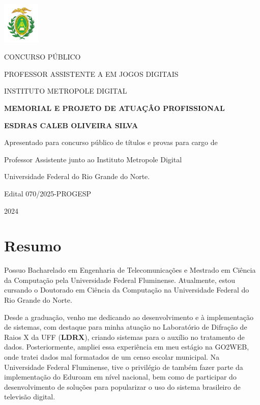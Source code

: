 \documentclass[10pt,a4paper,oneside]{book}
\newcommand{\Year}{2024}
\newcommand{\Author}{Esdras Caleb Oliveira Silva}
\newcommand{\UFF}{Universidade Federal Fluminense}
\newcommand{\UFRN}{Universidade Federal do Rio Grande do Norte}
\begin{document}
\pagestyle{plain}
\frontmatter

\begin{titlepage}
  \begin{center}
    \includegraphics[height=2cm]{images/logo.pdf}
    \vspace{1cm}

    CONCURSO PÚBLICO

    PROFESSOR ASSISTENTE A EM JOGOS DIGITAIS

    INSTITUTO METROPOLE DIGITAL
    \vspace{5cm}

    \textbf{\LARGE MEMORIAL E PROJETO DE ATUAÇÂO PROFISSIONAL}
    \vspace{1cm}

    \textbf{\LARGE \MakeUppercase{\Author{}}}
    \vspace{5cm}

    {\small
      Apresentado para concurso público de títulos e provas para cargo de

      Professor Assistente junto ao Instituto Metropole Digital

      Universidade Federal do Rio Grande do Norte.
      \vspace{1cm}

      Edital 070/2025-PROGESP
    }
    \vfill

    \Year{}
  \end{center}
\end{titlepage}

\chapter*{Resumo}

Possuo Bacharelado em Engenharia de Telecomunicações e Mestrado em Ciência da Computação pela \UFF{}.
Atualmente, estou cursando o Doutorado em Ciência da Computação na \UFRN{}.

Desde a graduação, venho me dedicando ao desenvolvimento e à implementação de sistemas, com destaque para minha atuação
no Laboratório de Difração de Raios X da UFF (\textbf{LDRX}), criando sistemas para o auxílio no tratamento de dados.
Posteriormente, ampliei essa experiência em meu estágio na GO2WEB, onde tratei dados mal formatados de um censo escolar
municipal. Na \UFF{}, tive o privilégio de também fazer parte da implementação do Eduroam em nível nacional, bem como de
participar do desenvolvimento de soluções para popularizar o uso do sistema brasileiro de televisão digital.
\end{document}
